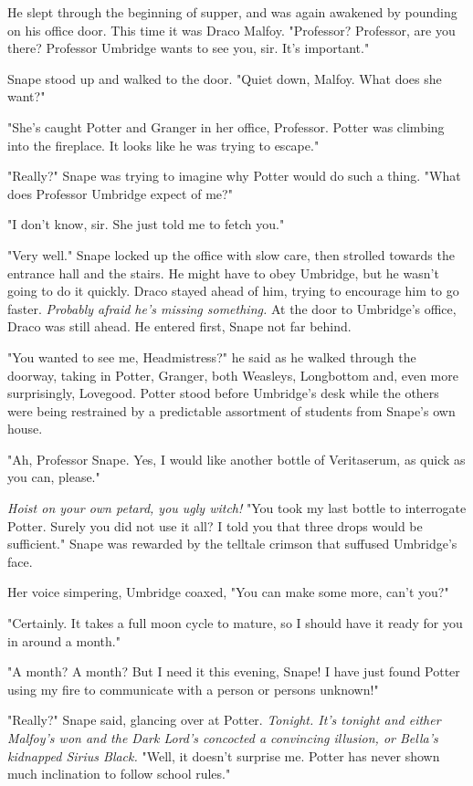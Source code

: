 \documentclass[a4paper,11pt]{article}
\begin{document}
He slept through the beginning of supper, and was again awakened by pounding on his office door. This time it was Draco Malfoy. "Professor? Professor, are you there? Professor Umbridge wants to see you, sir. It's important."

Snape stood up and walked to the door. "Quiet down, Malfoy. What does she want?"

"She's caught Potter and Granger in her office, Professor. Potter was climbing into the fireplace. It looks like he was trying to escape."

"Really?" Snape was trying to imagine why Potter would do such a thing. "What does Professor Umbridge expect of me?"

"I don't know, sir. She just told me to fetch you."

"Very well." Snape locked up the office with slow care, then strolled towards the entrance hall and the stairs. He might have to obey Umbridge, but he wasn't going to do it quickly. Draco stayed ahead of him, trying to encourage him to go faster. \emph{Probably afraid he's missing something.} At the door to Umbridge's office, Draco was still ahead. He entered first, Snape not far behind.

"You wanted to see me, Headmistress?" he said as he walked through the doorway, taking in Potter, Granger, both Weasleys, Longbottom and, even more surprisingly, Lovegood. Potter stood before Umbridge's desk while the others were being restrained by a predictable assortment of students from Snape's own house.

"Ah, Professor Snape. Yes, I would like another bottle of Veritaserum, as quick as you can, please."

\emph{Hoist on your own petard, you ugly witch!} "You took my last bottle to interrogate Potter. Surely you did not use it all? I told you that three drops would be sufficient." Snape was rewarded by the telltale crimson that suffused Umbridge's face.

Her voice simpering, Umbridge coaxed, "You can make some more, can't you?"

"Certainly. It takes a full moon cycle to mature, so I should have it ready for you in around a month."

"A month? A month? But I need it this evening, Snape! I have just found Potter using my fire to communicate with a person or persons unknown!"

"Really?" Snape said, glancing over at Potter. \emph{Tonight. It's tonight and either Malfoy's won and the Dark Lord's concocted a convincing illusion, or Bella's kidnapped Sirius Black.} "Well, it doesn't surprise me. Potter has never shown much inclination to follow school rules."
\end{document}
